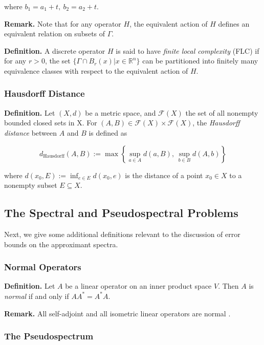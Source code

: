 \documentclass[11pt]{article}
\begin{document}
where $b_1 = a_1 + t, \ b_2 = a_2 + t$.

\textbf{Remark.} Note that for any operator $H$, the equivalent action of $H$ defines an equivalent relation on subsets of $\Gamma$.

\textbf{Definition.} A discrete operator $H$ is said to have \textit{finite local complexity} (FLC) if for any $r > 0$, the set $\{ \Gamma \cap B_r(x) \vert x \in \mathbb{R}^n \}$ can be partitioned into finitely many equivalence classes with respect to the equivalent action of $H$.

\subsubsection{Hausdorff Distance}

\textbf{Definition.} Let $(X, d)$ be a metric space, and $\mathscr{F}(X)$ the set of all nonempty bounded closed sets in X. For  $\left( A, B \right) \in \mathscr{F}(X) \times \mathscr{F}(X)$, the \textit{Hausdorff distance} between $A$ and $B$ is defined as \cite{topology}

\begin{equation}
    d_{\text{Hausdorff}} (A, B) := \max \left\{ \sup_{a \in A} d(a, B), \, \sup_{b \in B} d(A, b) \right\}
\end{equation}

where $d(x_0, E) := \inf_{e \in E} d(x_0, e)$ is the distance of a point $x_0 \in X$ to a nonempty subset $E \subseteq X$.

\subsection{The Spectral and Pseudospectral Problems}

Next, we give some additional definitions relevant to the discussion of error bounds on the approximant spectra.

\subsubsection{Normal Operators}

\textbf{Definition.} Let $A$ be a linear operator on an inner product space $V$. Then $A$ is \textit{normal} if and only if $AA^* = A^*A$.

\textbf{Remark.} All self-adjoint and all isometric linear operators are normal \cite{mathsofphys}.

\subsubsection{The Pseudospectrum}
\end{document}

